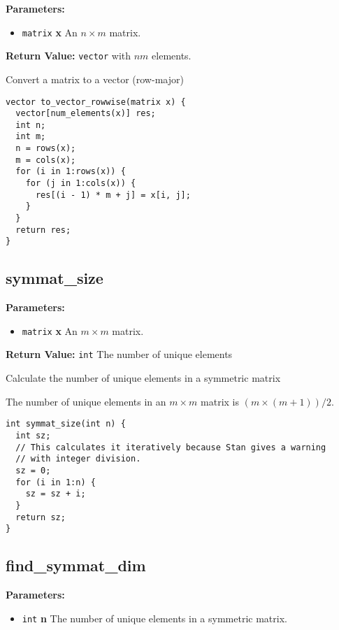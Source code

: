 \documentclass[]{book}
\providecommand{\tightlist}{%
  \setlength{\itemsep}{0pt}\setlength{\parskip}{0pt}}
\begin{document}
\textbf{Parameters:}

\begin{itemize}
\tightlist
\item
  \texttt{matrix} \textbf{x} An \(n \times m\) matrix.
\end{itemize}

\textbf{Return Value:} \texttt{vector} with \(n m\) elements.

Convert a matrix to a vector (row-major)

\begin{verbatim}
vector to_vector_rowwise(matrix x) {
  vector[num_elements(x)] res;
  int n;
  int m;
  n = rows(x);
  m = cols(x);
  for (i in 1:rows(x)) {
    for (j in 1:cols(x)) {
      res[(i - 1) * m + j] = x[i, j];
    }
  }
  return res;
}
\end{verbatim}

\subsection{symmat\_size}\label{symmatux5fsize}

\textbf{Parameters:}

\begin{itemize}
\tightlist
\item
  \texttt{matrix} \textbf{x} An \(m \times m\) matrix.
\end{itemize}

\textbf{Return Value:} \texttt{int} The number of unique elements

Calculate the number of unique elements in a symmetric matrix

The number of unique elements in an \(m \times m\) matrix is
\((m \times (m + 1)) / 2\).

\begin{verbatim}
int symmat_size(int n) {
  int sz;
  // This calculates it iteratively because Stan gives a warning
  // with integer division.
  sz = 0;
  for (i in 1:n) {
    sz = sz + i;
  }
  return sz;
}
\end{verbatim}

\subsection{find\_symmat\_dim}\label{findux5fsymmatux5fdim}

\textbf{Parameters:}

\begin{itemize}
\tightlist
\item
  \texttt{int} \textbf{n} The number of unique elements in a symmetric
  matrix.
\end{itemize}
\end{document}
